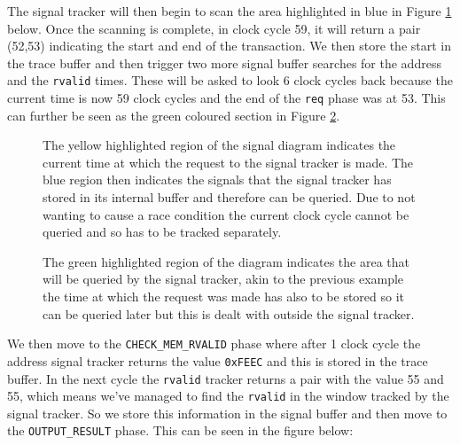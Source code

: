 The signal tracker will then begin to scan the area highlighted in blue in Figure \ref{fig:ex-tracker-example-memory-transaction-req-regions-highlighted} below. Once the scanning is complete, in clock cycle 59, it will return a pair (52,53) indicating the start and end of the transaction. We then store the start in the trace buffer and then trigger two more signal buffer searches for the address and the \texttt{rvalid} times. These will be asked to look 6 clock cycles back because the current time is now 59 clock cycles and the end of the \texttt{req} phase was at 53. This can further be seen as the green coloured section in Figure \ref{fig:ex-tracker-example-memory-transaction-rvalid-regions-highlighted}.

\begin{figure}[htbp]
	
	\caption{The yellow highlighted region of the signal diagram indicates the current time at which the request to the signal tracker is made. The blue region then indicates the signals that the signal tracker has stored in its internal buffer and therefore can be queried. Due to not wanting to cause a race condition the current clock cycle cannot be queried and so has to be tracked separately.}
	\label{fig:ex-tracker-example-memory-transaction-req-regions-highlighted}
\end{figure}

\begin{figure}[htbp]
	
	\caption{The green highlighted region of the diagram indicates the area that will be queried by the signal tracker, akin to the previous example the time at which the request was made has also to be stored so it can be queried later but this is dealt with outside the signal tracker.}
	\label{fig:ex-tracker-example-memory-transaction-rvalid-regions-highlighted}
\end{figure}

We then move to the \texttt{CHECK\_MEM\_RVALID} phase where after 1 clock cycle the address signal tracker returns the value \texttt{0xFEEC} and this is stored in the trace buffer. In the next cycle the \texttt{rvalid} tracker returns a pair with the value 55 and 55, which means we've managed to find the \texttt{rvalid} in the window tracked by the signal tracker. So we store this information in the signal buffer and then move to the \texttt{OUTPUT\_RESULT} phase. This can be seen in the figure below:


